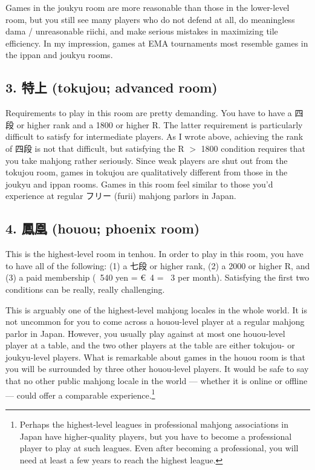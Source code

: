 \bigskip
Games in the {\jap joukyu} room are more reasonable than those in the lower-level room, but you still see many players who do not defend at all, do meaningless {\jap dama} / unreasonable {\jap riichi}, and make serious mistakes in maximizing tile efficiency. In my impression, games at EMA tournaments most resemble games in the {\jap ippan} and {\jap joukyu} rooms. 

\subsection*{3. 特上 ({\jap tokujou}; advanced room)}
Requirements to play in this room are pretty demanding. You have to have a 四段 or higher rank and a 1800 or higher R. The latter requirement is particularly difficult to satisfy for intermediate players. As I wrote above, achieving the rank of 四段 is not that difficult, but satisfying the R $>$ 1800 condition requires that you take mahjong rather seriously. Since weak players are shut out from the {\jap tokujou} room, games in {\jap tokujou} are qualitatively different from those in the {\jap joukyu} and {\jap ippan} rooms. Games in this room feel similar to those you'd experience at regular フリー ({\jap furii}) mahjong parlors in Japan. 

\subsection*{4. 鳳凰 ({\jap houou}; phoenix room)}
This is the highest-level room in {\jap tenhou}. In order to play in this room, you have to have all of the following: (1) a 七段 or higher rank, (2) a 2000 or higher R, and (3) a paid membership (\textyen~540 yen = \euro~4 = \textsterling~3 per month). Satisfying the first two conditions can be really, really challenging. 

\bigskip
This is arguably one of the highest-level mahjong locales in the whole world. It is not uncommon for you to come across a {\jap houou}-level player at a regular mahjong parlor in Japan. However, you usually play against at most one {\jap houou}-level player at a table, and the two other players at the table are either {\jap tokujou}- or {\jap joukyu}-level players. What is remarkable about games in the {\jap houou} room is that you will be surrounded by three other {\jap houou}-level players. 
It would be safe to say that no other public mahjong locale in the world --- whether it is online or offline --- could offer a comparable experience.\footnote{Perhaps the highest-level leagues in professional mahjong associations in Japan have higher-quality players, but you have to become a professional player to play at such leagues. Even after becoming a professional, you will need at least a few years to reach the highest league.}

